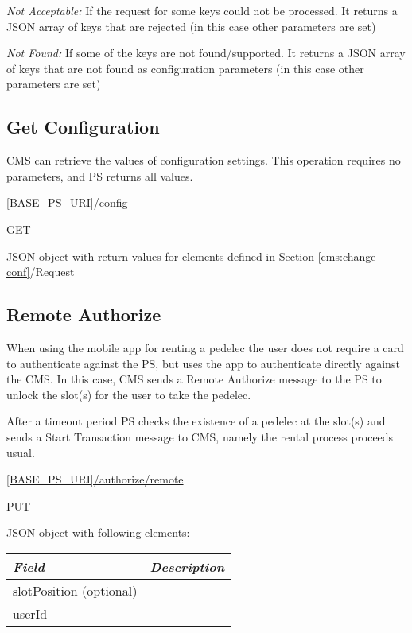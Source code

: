\textit{Not Acceptable:} If the request for some keys could not be processed. It returns a JSON array of keys that are rejected (in this case other parameters are set)

\textit{Not Found:} If some of the keys are not found/supported. It returns a JSON array of keys that are not found as configuration parameters (in this case other parameters are set)

\subsection{Get Configuration}

\acs{CMS} can retrieve the values of configuration settings. This operation requires no parameters, and \acs{PS} returns all values.

 \url{[BASE_PS_URI]/config}

 GET


 JSON object with return values for elements defined in Section \ref{cms:change-conf}/Request


\subsection{Remote Authorize}

When using the mobile app for renting a pedelec the user does not require a card to authenticate against the \acs{PS}, but uses the app to authenticate directly against the \acs{CMS}. In this case, \acs{CMS} sends a Remote Authorize message to the \acs{PS} to unlock the slot(s) for the user to take the pedelec. 

After a timeout period \acs{PS} checks the existence of a pedelec at the slot(s) and sends a Start Transaction message to \acs{CMS}, namely the rental process proceeds usual.


 \url{[BASE_PS_URI]/authorize/remote}

 PUT

JSON object with following elements:\\
\begin{tabularx}{\linewidth}{ | l | X | }
  \hline
  \textit{Field} & \textit{Description} \\
  \hline \hline
  slotPosition (optional) 		&  \\
  userId		&  \\
  \hline
\end{tabularx}

